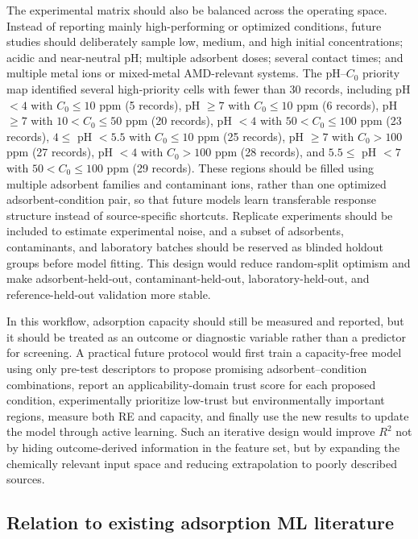 \documentclass[review,12pt,number]{elsarticle}
\begin{document}
The experimental matrix should also be balanced across the operating space. Instead of reporting mainly high-performing or optimized conditions, future studies should deliberately sample low, medium, and high initial concentrations; acidic and near-neutral pH; multiple adsorbent doses; several contact times; and multiple metal ions or mixed-metal AMD-relevant systems. The pH--$C_0$ priority map identified several high-priority cells with fewer than 30 records, including pH $<4$ with $C_0\leq10$ ppm (5 records), pH $\geq7$ with $C_0\leq10$ ppm (6 records), pH $\geq7$ with $10<C_0\leq50$ ppm (20 records), pH $<4$ with $50<C_0\leq100$ ppm (23 records), $4\leq$ pH $<5.5$ with $C_0\leq10$ ppm (25 records), pH $\geq7$ with $C_0>100$ ppm (27 records), pH $<4$ with $C_0>100$ ppm (28 records), and $5.5\leq$ pH $<7$ with $50<C_0\leq100$ ppm (29 records). These regions should be filled using multiple adsorbent families and contaminant ions, rather than one optimized adsorbent-condition pair, so that future models learn transferable response structure instead of source-specific shortcuts. Replicate experiments should be included to estimate experimental noise, and a subset of adsorbents, contaminants, and laboratory batches should be reserved as blinded holdout groups before model fitting. This design would reduce random-split optimism and make adsorbent-held-out, contaminant-held-out, laboratory-held-out, and reference-held-out validation more stable.

In this workflow, adsorption capacity should still be measured and reported, but it should be treated as an outcome or diagnostic variable rather than a predictor for screening. A practical future protocol would first train a capacity-free model using only pre-test descriptors to propose promising adsorbent--condition combinations, report an applicability-domain trust score for each proposed condition, experimentally prioritize low-trust but environmentally important regions, measure both RE and capacity, and finally use the new results to update the model through active learning. Such an iterative design would improve $R^2$ not by hiding outcome-derived information in the feature set, but by expanding the chemically relevant input space and reducing extrapolation to poorly described sources.

\subsection{Relation to existing adsorption ML literature}
\end{document}

